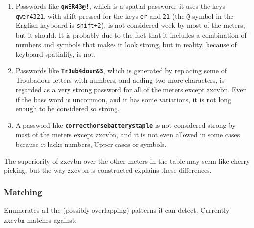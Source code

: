 \begin{enumerate}
\setlength\itemsep{-3pt}

\item Passwords like \texttt{\textbf{qwER43@!}}, which is a spatial password: it uses the keys \texttt{qwer4321}, with shift pressed for the keys \texttt{er} and \texttt{21} (the \texttt{@} symbol in the English keyboard is \texttt{shift+2}), is not considered week by most of the meters, but it should. It is probably due to the fact that it includes a combination of numbers and symbols that makes it look strong, but in reality, because of keyboard spatiality, is not.

\item Passwords like \texttt{\textbf{Tr0ub4dour\&3}}, which is generated by replacing some of Troubadour letters with numbers, and adding two more characters, is regarded as a very strong password for all of the meters except zxcvbn. Even if the base word is uncommon, and it has some variations, it is not long enough to be considered so strong.
\item A password like \texttt{\textbf{correcthorsebatterystaple}} is not considered strong by most of the meters except zxcvbn, and it is not even allowed in some cases because it lacks numbers, Upper-cases or symbols.
\end{enumerate}

The superiority of zxcvbn over the other meters in the table may seem like cherry picking, but the way zxcvbn is constructed explains these differences.

\subsubsection*{Matching}

Enumerates all the (possibly overlapping) patterns it can detect. Currently zxcvbn matches against:

